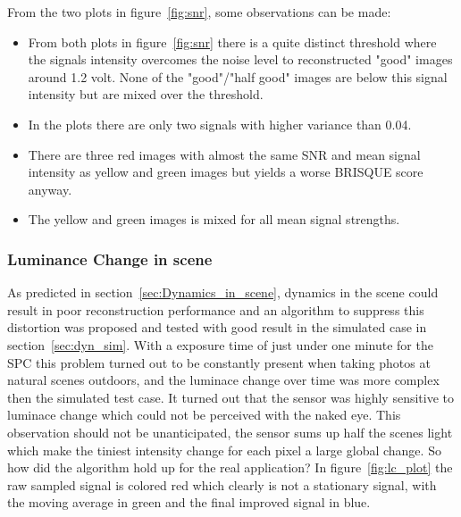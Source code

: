 From the two plots in figure~\ref{fig:snr}, some observations can be made:


\begin{itemize}
\item From both plots in figure~\ref{fig:snr} there is a quite distinct threshold where the signals intensity overcomes the noise level to reconstructed "good" images around 1.2 volt. None of the "good"/"half good" images are below this signal intensity but are mixed over the threshold. 


\item In the plots there are only two signals with higher variance than 0.04.


\item There are three red images with almost the same SNR and mean signal intensity as yellow and green images but yields a worse BRISQUE score anyway.

\item The yellow and green images is mixed for all mean signal strengths.

\end{itemize}



\subsubsection{Luminance Change in scene}
As predicted in section~\ref{sec:Dynamics_in_scene}, dynamics in the scene could result in poor reconstruction performance and an algorithm to suppress this distortion was proposed and tested with good result in the simulated case in section~\ref{sec:dyn_sim}. With a exposure time of just under one minute for the SPC this problem turned out to be constantly present when taking photos at natural scenes outdoors, and the luminace change over time was more complex then the simulated test case. It turned out that the sensor was highly sensitive to luminace change which could not be perceived with the naked eye. This observation should not be unanticipated, the sensor sums up half the scenes light which make the tiniest intensity change for each pixel a large global change. So how did the algorithm hold up for the real application? In figure~\ref{fig:lc_plot} the raw sampled signal is colored red which clearly is not a stationary signal, with the moving average in green and the final improved signal in blue. 

